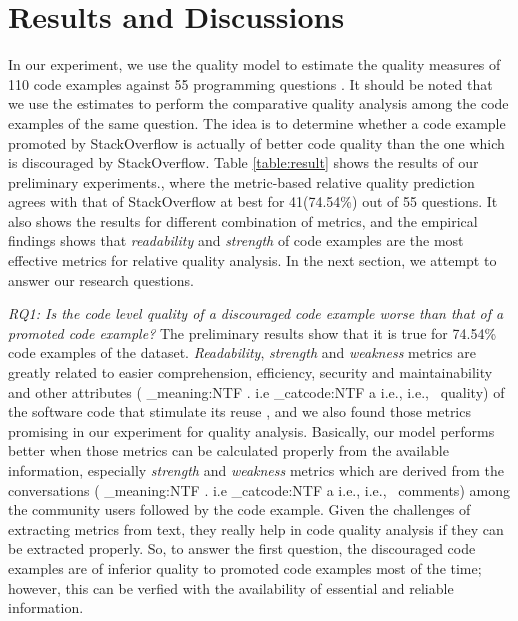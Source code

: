 \documentclass{sig-alternate}
\makeatletter
\newcommand\latinabbrev[1]{
  \peek_meaning:NTF . {%
    #1\@}%
  { \peek_catcode:NTF a {%
      #1., \@ }%
    {#1., \@}}}
\def\ie{\latinabbrev{i.e}}
\makeatother
\begin{document}
\section{Results and Discussions}
\label{sec:experiment}
In our experiment, we use the quality model to estimate the quality measures of 110 code examples against 55 programming questions \cite{expdata}. It should be noted that we use the estimates to perform the comparative quality analysis among the code examples of the same question. The idea is to determine whether a code example promoted by StackOverflow is actually of better code quality than the one which is discouraged by StackOverflow. Table \ref{table:result} shows the results of our preliminary experiments., where the metric-based relative quality prediction agrees with that of StackOverflow at best for 41(74.54\%)  out of 55 questions. It also shows the results for different combination of metrics, and the empirical findings shows that \emph{readability} and \emph{strength} of code examples are the most effective metrics for relative quality analysis. In the next section, we attempt to answer our research questions.

\emph{RQ1: Is the code level quality of a discouraged code example worse than that of a promoted code example?} The preliminary results show that it is true for 74.54\% code examples of the dataset. \emph{Readability}, \emph{strength} and \emph{weakness} metrics are greatly related to easier comprehension, efficiency, security and maintainability and other attributes (\ie\ quality) of the software code that stimulate its reuse \cite{readability}, and we also found those metrics promising in our experiment for quality analysis. Basically, our model performs better when those metrics can be calculated properly from the available information, especially \emph{strength} and \emph{weakness} metrics which are derived from the conversations (\ie\ comments) among the community users followed by the code example. Given the challenges of extracting metrics from text, they really help in code quality analysis if they can be extracted properly. So, to answer the first question, the discouraged code examples are of inferior quality to promoted code examples most of the time; however, this can be verfied with the availability of essential and reliable information.
\end{document}
